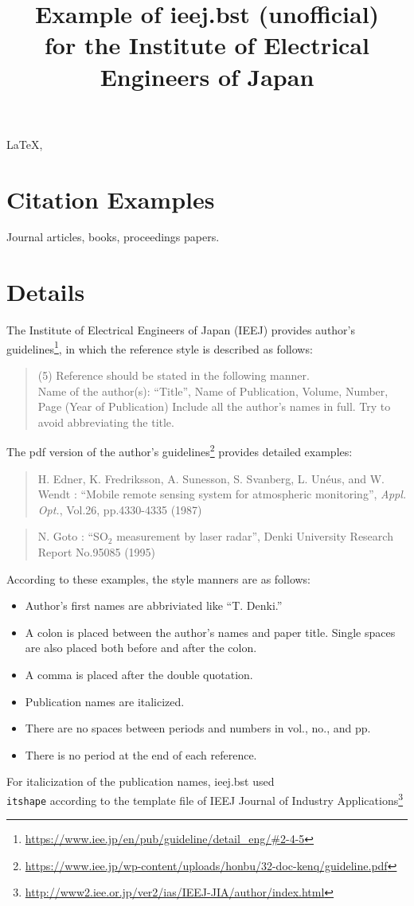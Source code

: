 \documentclass[english]{ieej-e}
\title{Example of ieej.bst (unofficial)\\for the Institute of Electrical Engineers of Japan}
\begin{document}
\begin{abstract}

\end{abstract}
\begin{keyword}
  \LaTeX, 
\end{keyword}
\maketitle


\section{Citation Examples}
Journal articles\cite{Edner1987,Denki2001}, books\cite{Knuth1994}, proceedings papers\cite{Yamada2001}.


\section{Details}
The Institute of Electrical Engineers of Japan (IEEJ) provides author's guidelines\footnote{\url{https://www.iee.jp/en/pub/guideline/detail_eng/#2-4-5}}, in which the reference style is described as follows:
\begin{quotation}
  (5) Reference should be stated in the following manner.\\
  Name of the author(s): “Title”, Name of Publication, Volume, Number, Page (Year of Publication) Include all the author’s names in full. Try to avoid abbreviating the title.
\end{quotation}

The pdf version of the author's guidelines\footnote{\url{https://www.iee.jp/wp-content/uploads/honbu/32-doc-kenq/guideline.pdf}} provides detailed examples:
\begin{quotation}
  \footnotesize H. Edner, K. Fredriksson, A. Sunesson, S. Svanberg, L. Unéus, and W. Wendt : ``Mobile remote sensing system for atmospheric monitoring'', {\itshape Appl. Opt.}, Vol.26, pp.4330-4335 (1987)
\end{quotation}
\begin{quotation}
  \footnotesize N. Goto : “SO${}_2$ measurement by laser radar'', Denki University Research Report No.95085 (1995)
\end{quotation}

According to these examples, the style manners are as follows:
\begin{itemize}
  \item Author's first names are abbriviated like ``T. Denki.''
  \item A colon is placed between the author's names and paper title. Single spaces are also placed both before and after the colon.
  \item A comma is placed after the double quotation.
  \item Publication names are italicized.
  \item There are no spaces between periods and numbers in vol., no., and pp.
  \item There is no period at the end of each reference.
\end{itemize}

For italicization of the publication names, ieej.bst used \texttt{\\itshape} according to the template file of IEEJ Journal of Industry Applications\footnote{\url{http://www2.iee.or.jp/ver2/ias/IEEJ-JIA/author/index.html}}




\end{document}
